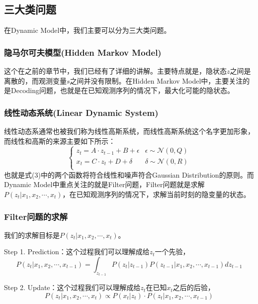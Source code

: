 \documentclass[a4paper]{article}
\begin{document}
\subsection{三大类问题}
在Dynamic Model中，我们主要可以分为三大类问题。
\subsubsection{隐马尔可夫模型(Hidden Markov Model)}
这个在之前的章节中，我们已经有了详细的讲解。主要特点就是，隐状态$z$之间是离散的，而观测变量$s$之间并没有限制。在Hidden Markov Model中，主要关注的是Decoding问题，也就是在已知观测序列的情况下，最大化可能的隐状态。

\subsubsection{线性动态系统(Linear Dynamic System)}
线性动态系通常也被我们称为线性高斯系统，而线性高斯系统这个名字更加形象，而线性和高斯的来源主要如下所示：
\begin{equation}
    \left\{
        \begin{array}{ll}
            z_t = A\cdot z_{t-1}+B+\epsilon & \epsilon \sim \mathcal{N}(0,Q) \\
            x_t = C\cdot z_{t}+D+\delta & \delta \sim \mathcal{N}(0,R)\\
        \end{array}
    \right.
\end{equation}
也就是式(3)中的两个函数将符合线性和噪声符合Gaussian Distribution的原则。而Dynamic Model中重点关注的就是Filter问题，Filter问题就是求解$P(z_t|x_1,x_2,\cdots,x_t)$，在已知观测序列的情况下，求解当前时刻的隐变量的状态。

\subsubsection{Filter问题的求解}
我们的求解目标是$P(z_t|x_1,x_2,\cdots,x_t)$。

Step 1. Prediction：这个过程我们可以理解成给$z_t$一个先验，
\begin{equation}
    P(z_t|x_1,x_2,\cdots,x_{t-1}) = \int_{z_{t-1}} P(z_t|z_{t-1}) P(z_{t-1}|x_1,x_2,\cdots,x_{t-1}) dz_{t-1}
\end{equation}

Step 2. Update：这个过程我们可以理解成给$z_t$在已知$x_t$之后的后验，
\begin{equation}
    P(z_t|x_1,x_2,\cdots,x_t) \propto P(x_t|z_t)\cdot P(z_t|x_1,x_2,\cdots,x_{t-1})
\end{equation}
\end{document}

